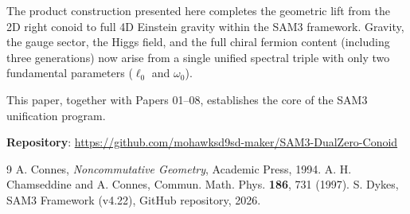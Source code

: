 \documentclass[11pt,a4paper]{article}
\begin{document}
The product construction presented here completes the geometric lift from the 2D right conoid to full 4D Einstein gravity within the SAM3 framework. Gravity, the gauge sector, the Higgs field, and the full chiral fermion content (including three generations) now arise from a single unified spectral triple with only two fundamental parameters (\(\ell_0\) and \(\omega_0\)).

This paper, together with Papers 01--08, establishes the core of the SAM3 unification program.

\vspace{1em}
\textbf{Repository}: \url{https://github.com/mohawksd9sd-maker/SAM3-DualZero-Conoid}

\begin{thebibliography}{9}
 A. Connes, \textit{Noncommutative Geometry}, Academic Press, 1994.
 A. H. Chamseddine and A. Connes, Commun. Math. Phys. \textbf{186}, 731 (1997).
 S. Dykes, SAM3 Framework (v4.22), GitHub repository, 2026.
\end{thebibliography}
\end{document}
